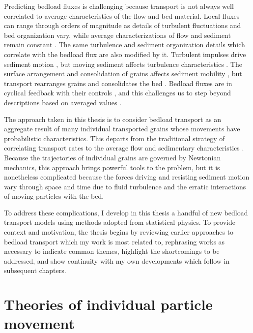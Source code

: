 Predicting bedload fluxes is challenging because transport is not always well correlated to average characteristics of the flow and bed material. 
Local fluxes can range through orders of magnitude as details of turbulent fluctuations and bed organization vary, while average characterizations of flow and sediment remain constant \citep{Sumer2003, Charru2004, Hassan2008, Venditti2017}.
The same turbulence and sediment organization details which correlate with the bedload flux are also modified by it.
Turbulent impulses drive sediment motion \citep{Valyrakis2010, Celik2014, Amir2014, Shih2017}, but moving sediment affects turbulence characteristics \citep{Singh2010, Santos2014, Liu2016}.
The surface arrangement and consolidation of grains affects sediment mobility \citep{Miller1966,Paintal1971,Dwivedi2012}, but transport rearranges grains and consolidates the bed \citep{Kirchener1990, Charru2004, Allen2018, Masteller2019, Pretzlav2020}.
Bedload fluxes are in cyclical feedback with their controls \citep{Jerolmack2005}, and this challenges us to step beyond descriptions based on averaged values \citep{Ancey2020b}.

The approach taken in this thesis is to consider bedload transport as an aggregate result of many individual transported grains whose movements have probabilistic characteristics.
This departs from the traditional strategy of correlating transport rates to the average flow and sedimentary characteristics \citep{MeyerPeter1948, Parker1990, Wilcock2001}.
Because the trajectories of individual grains are governed by Newtonian mechanics, this approach brings powerful tools to the problem, but it is nonetheless complicated because the forces driving and resisting sediment motion vary through space and time due to fluid turbulence and the erratic interactions of moving particles with the bed.


To address these complications, I develop in this thesis a handful of new bedload transport models using methods adopted from statistical physics.
To provide context and motivation, the thesis begins by reviewing earlier approaches to bedload transport which my work is most related to, rephrasing works as necessary to indicate common themes, highlight the shortcomings to be addressed, and show continuity with my own developments which follow in subsequent chapters.

\section{Theories of individual particle movement}
\label{sec:trajmodels}

